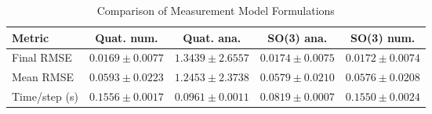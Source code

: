 \begin{table}[htbp]
\centering
\caption{Comparison of Measurement Model Formulations}
\label{tab:method_comparison}
\begin{tabular}{lcccc}
\hline
Metric & Quat. num. & Quat. ana. & SO(3) ana. & SO(3) num. \\
\hline
Final RMSE & $0.0169 \pm 0.0077$ & $1.3439 \pm 2.6557$ & $0.0174 \pm 0.0075$ & $0.0172 \pm 0.0074$ \\
Mean RMSE & $0.0593 \pm 0.0223$ & $1.2453 \pm 2.3738$ & $0.0579 \pm 0.0210$ & $0.0576 \pm 0.0208$ \\
Time/step (s) & $0.1556 \pm 0.0017$ & $0.0961 \pm 0.0011$ & $0.0819 \pm 0.0007$ & $0.1550 \pm 0.0024$ \\
\hline
\end{tabular}
\end{table}
